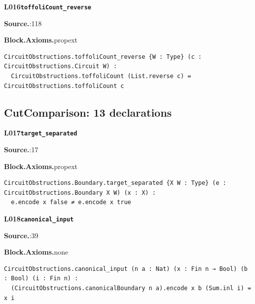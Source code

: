 \par\medskip\noindent\begin{minipage}{\textwidth}
{\small\bfseries L016\enspace\texttt{toffoliCount\_reverse}\par}
{\footnotesize\raggedright\textbf{Source.}\enspace{}:118\par
\textbf{Block.}\quad\textbf{Axioms.}\enspace propext\par}\nopagebreak
\begin{lstlisting}
CircuitObstructions.toffoliCount_reverse {W : Type} (c : CircuitObstructions.Circuit W) :
  CircuitObstructions.toffoliCount (List.reverse c) = CircuitObstructions.toffoliCount c
\end{lstlisting}
\end{minipage}\par

\subsection*{CutComparison: 13 declarations}
\par\medskip\noindent\begin{minipage}{\textwidth}
{\small\bfseries L017\enspace\texttt{target\_separated}\par}
{\footnotesize\raggedright\textbf{Source.}\enspace{}:17\par
\textbf{Block.}\quad\textbf{Axioms.}\enspace propext\par}\nopagebreak
\begin{lstlisting}
CircuitObstructions.Boundary.target_separated {X W : Type} (e : CircuitObstructions.Boundary X W) (x : X) :
  e.encode x false ≠ e.encode x true
\end{lstlisting}
\end{minipage}\par

\par\medskip\noindent\begin{minipage}{\textwidth}
{\small\bfseries L018\enspace\texttt{canonical\_input}\par}
{\footnotesize\raggedright\textbf{Source.}\enspace{}:39\par
\textbf{Block.}\quad\textbf{Axioms.}\enspace none\par}\nopagebreak
\begin{lstlisting}
CircuitObstructions.canonical_input (n a : Nat) (x : Fin n → Bool) (b : Bool) (i : Fin n) :
  (CircuitObstructions.canonicalBoundary n a).encode x b (Sum.inl i) = x i
\end{lstlisting}
\end{minipage}\par

